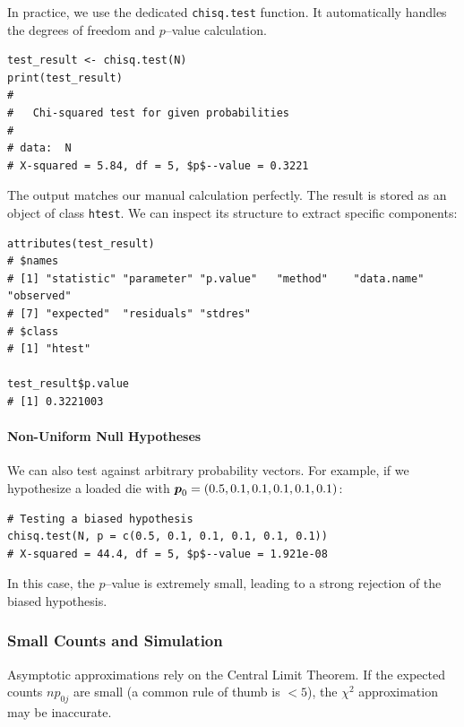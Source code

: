 In practice, we use the dedicated \texttt{chisq.test} function. It automatically handles the degrees of freedom and $p$--value calculation.

\begin{verbatim}
test_result <- chisq.test(N)
print(test_result)
# 
# 	Chi-squared test for given probabilities
# 
# data:  N
# X-squared = 5.84, df = 5, $p$--value = 0.3221
\end{verbatim}

The output matches our manual calculation perfectly. The result is stored as an object of class \texttt{htest}. We can inspect its structure to extract specific components:

\begin{verbatim}
attributes(test_result)
# $names
# [1] "statistic" "parameter" "p.value"   "method"    "data.name" "observed" 
# [7] "expected"  "residuals" "stdres"   
# $class
# [1] "htest"

test_result$p.value
# [1] 0.3221003
\end{verbatim}

\paragraph{Non-Uniform Null Hypotheses}
We can also test against arbitrary probability vectors. For example, if we hypothesize a loaded die with $\boldsymbol{p}_0 = (0.5, 0.1, 0.1, 0.1, 0.1, 0.1)$:

\begin{verbatim}
# Testing a biased hypothesis
chisq.test(N, p = c(0.5, 0.1, 0.1, 0.1, 0.1, 0.1))
# X-squared = 44.4, df = 5, $p$--value = 1.921e-08
\end{verbatim}
In this case, the $p$--value is extremely small, leading to a strong rejection of the biased hypothesis.

\subsubsection{Small Counts and Simulation}
\label{sub:Small_Counts}

Asymptotic approximations rely on the Central Limit Theorem. If the expected counts $n p_{0j}$ are small (a common rule of thumb is $<5$), the $\chi^2$ approximation may be inaccurate.

